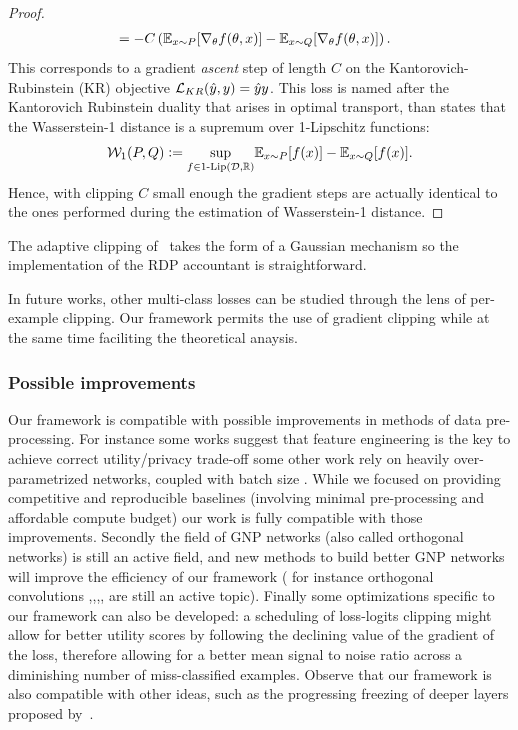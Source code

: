 \begin{proof}
\begin{align*}
        &= -C\left(\mathbb{E}_{x\sim P}[\nabla_{\theta}f(\theta, x)]-\mathbb{E}_{x\sim Q}[\nabla_{\theta}f(\theta, x)]\right).
    \end{align*}
    This corresponds to a gradient \textit{ascent} step of length $C$ on the Kantorovich-Rubinstein (KR) objective $\mathcal{L}_{KR}(\hat y, y)=\hat yy$. This loss is named after the Kantorovich Rubinstein duality that arises in optimal transport, than states that the Wasserstein-1 distance is a supremum over 1-Lipschitz functions:
    \begin{equation}
        \mathcal{W}_1(P,Q)\vcentcolon=\underset{f\in\text{1-Lip}(\mathcal{D},\mathbb{R})}{\sup}\mathbb{E}_{x\sim P}[f(x)]-\mathbb{E}_{x\sim Q}[f(x)].
    \end{equation}
    Hence, with clipping $C$ small enough the gradient steps are actually identical to the ones performed during the estimation of Wasserstein-1 distance.  
    \end{proof}
  
    The adaptive clipping of~\cite{andrew2021differentially} takes the form of a Gaussian mechanism so the implementation of the RDP accountant is straightforward. 

    In future works, other multi-class losses can be studied through the lens of per-example clipping. Our framework permits the use of gradient clipping while at the same time faciliting the theoretical anaysis.  

\subsubsection{Possible improvements}

Our framework is compatible with possible improvements in methods of data pre-processing. For instance some works suggest that feature engineering is the key to achieve correct utility/privacy trade-off \cite{tramer2021differentially} some other work rely on heavily over-parametrized networks, coupled with batch size \cite{de2022unlocking}. While we focused on providing competitive and reproducible baselines (involving minimal pre-processing and affordable compute budget) our work is fully compatible with those improvements.
Secondly the field of GNP networks (also called orthogonal networks) is still an active field, and new methods to build better GNP networks will improve the efficiency of our framework ( for instance orthogonal convolutions \cite{achour2022existence},\cite{li2019orthogonal},\cite{li2019preventing},\cite{trockman2021orthogonalizing},\cite{singla2021skew} are still an active topic).
Finally some optimizations specific to our framework can also be developed: a scheduling of loss-logits clipping might allow for better utility scores by following the declining value of the gradient of the loss, therefore allowing for a better mean signal to noise ratio across a diminishing number of miss-classified examples. Observe that our framework is also compatible with other ideas, such as the progressing freezing of deeper layers proposed by~\cite{tang2022dp}.  
